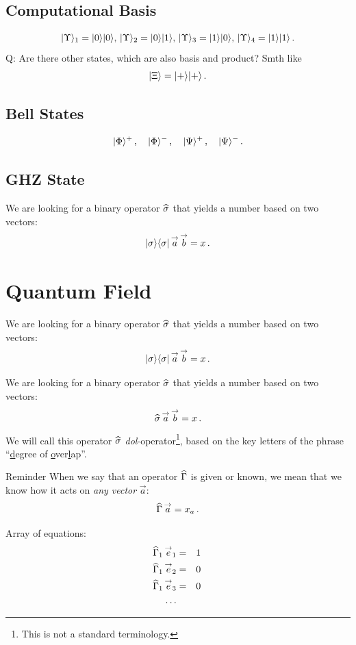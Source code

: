 \subsection{Computational Basis}
\[
|{\Upsilon}\rangle_1 = |{0}\rangle|{0}\rangle,\,|{\Upsilon}\rangle_2 = |{0}\rangle|{1}\rangle,\,
|{\Upsilon}\rangle_3 = |{1}\rangle|{0}\rangle,\,|{\Upsilon}\rangle_4 = |{1}\rangle|{1}\rangle\,.
\]
Q: Are there other states, which are also basis and product? Smth like
\[
|{\Xi}\rangle=|{+}\rangle|{+}\rangle\,.
\]

\subsection{Bell States}
\[
|{\Phi}\rangle^{+}\,,\quad|{\Phi}\rangle^{-}\,,\quad
|{\Psi}\rangle^{+}\,,\quad|{\Psi}\rangle^{-}\,.
\]


\subsection{GHZ State}\label{sec:GHZState}
We are looking for a binary operator $\widehat{\sigma}$ that yields a number
based on two vectors:
\[
|{\sigma}\rangle\langle{\sigma}|\,\overset{\rightarrow}{a}\,\overset{\rightarrow}{b}=x\,.
\]


\section{Quantum Field}\label{sec:QuantumField}
We are looking for a binary operator $\widehat{\sigma}$ that yields a number
based on two vectors:
\[
|{\sigma}\rangle\langle{\sigma}|\,\overset{\rightarrow}{a}\,\overset{\rightarrow}{b}=x\,.
\]

We are looking for a binary operator $\widehat{\sigma}$ that yields a number
based on two vectors:
\[
\widehat{\sigma}\,\overset{\rightarrow}{a}\,\overset{\rightarrow}{b}=x\,.
\]
We will call this operator $\widehat{\sigma}$ \emph{dol}-operator\footnote{This is not a
standard terminology. }, based on the key letters of the phrase
``\underline{d}egree of \underline{o}ver\underline{l}ap''.

\begin{myrem}{Reminder}
When we say that an operator $\widehat{\Gamma}$ is given or known, we
mean that we know how it acts on \emph{any vector} $\vec{a}$:
\[
\widehat{\Gamma}\,\overset{\rightarrow}{a} = x_a\,.
\]
\end{myrem}

Array of equations:
\begin{eqnarray}
  \widehat{\Gamma}_1\,\overset{\rightarrow}{e}_1 & = & 1\,\\
  \widehat{\Gamma}_1\,\overset{\rightarrow}{e}_2 & = & 0\,\\
  \widehat{\Gamma}_1\,\overset{\rightarrow}{e}_3 & = & 0\,\\
  \ldots
\end{eqnarray}

